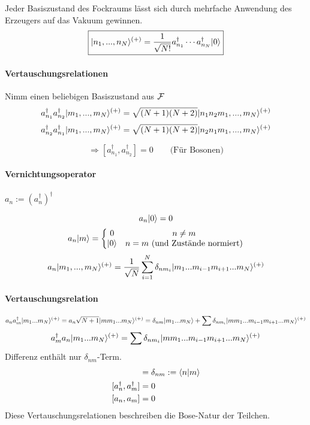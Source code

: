 \documentclass[11pt,a4paper]{report}
\begin{document}
Jeder Basiszustand des Fockraums lässt sich durch mehrfache Anwendung des Erzeugers auf das Vakuum gewinnen.
$$\boxed{|n_1,...,n_N\rangle^{(+)} = \frac{1}{\sqrt{N!}}a_{n_1}^\dagger\cdots a_{n_N}^\dagger |0\rangle}$$

\paragraph{Vertauschungsrelationen} Nimm einen beliebigen Basiszustand aus $\mathcal{F}$
$$a_{n_1}^\dagger a_{n_2}^\dagger |m_1,...,m_N\rangle^{(+)} = \sqrt{(N+1)(N+2)}|n_1n_2m_1,...,m_N\rangle^{(+)}$$
$$a_{n_2}^\dagger a_{n_1}^\dagger |m_1,...,m_N\rangle^{(+)} = \sqrt{(N+1)(N+2)}|n_2n_1m_1,...,m_N\rangle^{(+)}$$

\newcommand{\create}[1]{a_{#1}^\dagger}
\newcommand{\destroy}[1]{a_{#1}}

$$\Rightarrow [\create{n_1},\create{n_2}] = 0\qquad \text{(Für Bosonen)}$$

\paragraph{Vernichtungsoperator} $a_n := (\create{n})^\dagger$

$$\destroy{n}\ket{0} = 0$$
$$\destroy{n}\ket{m} = \left\{\begin{matrix}
0 & n\neq m \\
\ket{0} &n=m \text{ (und Zustände normiert)}
\end{matrix}\right.$$
$$\destroy{n}\ket{m_1,...,m_N}^{(+)} = \frac{1}{\sqrt{N}}\sum_{i=1}^N \delta_{nm_i}\ket{m_1...m_{i-1}m_{i+1}...m_N}^{(+)}$$

\paragraph{Vertauschungsrelation}
$$\destroy{n}\create{m}\ket{m_1...m_N}^{(+)} = \destroy{n}\sqrt{N+1}\ket{mm_1...m_N}^{(+)} =  \delta_{nm}\ket{m_1...m_N} + \sum \delta_{nm_i}\ket{mm_1...m_{i-1}m_{i+1}...m_N}^{(+)}$$
$$\create{m}\destroy{n}\ket{m_1...m_N}^{(+)}= \sum \delta_{nm_i}\ket{mm_1...m_{i-1}m_{i+1}...m_N}^{(+)}$$
Differenz enthält nur $\delta_{nm}$-Term.
\begin{align*}
[\destroy{n},\create{m}]&=\delta_{nm} :=\sprod{n}{m} \\
[\create{n},\create{m}] &= 0 \\
[\destroy{n},\destroy{m}] &= 0
\end{align*}
Diese Vertauschungsrelationen beschreiben die Bose-Natur der Teilchen. 
\end{document}
